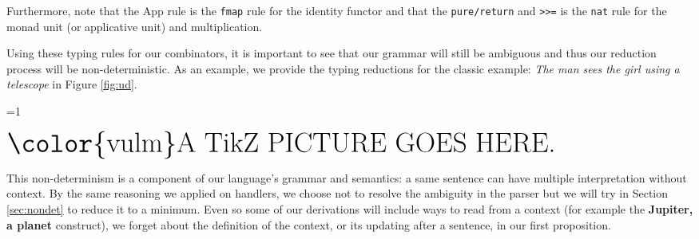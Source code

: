 \documentclass[math, english, info]{cours}
\makeatletter
\def\tikzimp@rt{0}
\def\inputtikz#1{
	\ifnum\tikzimp@rt=1
		
	\else
		\ensuremath{\text{\Huge\color{vulm}A TikZ PICTURE GOES HERE.}}
	\fi
}
\makeatother
\begin{document}
Furthermore, note that the App rule is the \texttt{fmap} rule for the identity functor and that the \texttt{pure/return} and \texttt{>>=} is the \texttt{nat} rule for the monad unit (or applicative unit) and multiplication.

\medskip

Using these typing rules for our combinators, it is important to see that our grammar will still be ambiguous and thus our reduction process will be non-deterministic.
As an example, we provide the typing reductions for the classic example: \textsl{The man sees the girl using a telescope} in Figure \ref{fig:ud}.

\makeatletter
\def\c@lsep{2.3}
\def\r@wsep{.8}


\newcommand{\wnode}[3]{%
	\node (#2) at (#1*\c@lsep, 0) [wordnode] {#2};
	\node[anchor=north] (#2-) at ($(#1*\c@lsep, 0) + (0, -.142)$) [typenode] {\ensuremath{#3}};
}
\newcommand{\utnode}[3]{%
	\path let \p1 = (#2.north), \p2 = (#3.north) in coordinate (Q1) at (\x1, {max(\y1, \y2)});
	\path let \p1 = (#2.north), \p2 = (#3.north) in coordinate (Q2) at (\x2, {max(\y1, \y2)});
	\node (#2#3) at ($($(Q1)!0.5!(Q2)$) + (0, 1)$) [treenode] {\ensuremath{#1}};
	\draw[uptree] ($(#2.north) + (0, .142)$) -- (#2#3.south);
	\draw[uptree] ($(#3.north) + (0, .142)$) -- (#2#3.south);
}
\newcommand{\dtnode}[4][0.5]{%
	\path let \p1 = (#3.south), \p2 = (#4.south) in coordinate (Q1) at (\x1, {min(\y1, \y2)});
	\path let \p1 = (#3.south), \p2 = (#4.south) in coordinate (Q2) at (\x2, {min(\y1, \y2)});
	\node (#3#4) at ($($(Q1)!#1!(Q2)$) + (0, -1)$) [treenode] {\ensuremath{#2}};
	\draw[downtree] ($(#3.south) + (0, -.142)$) -- (#3#4.north);
	\draw[downtree] ($(#4.south) + (0, -.142)$) -- (#3#4.north);
}
\makeatother

\begin{figure*}
	\centering
	\inputtikz{parse-tree-ex}
		\caption{Parsing trees for the typing of \textsl{The man sees the girl using a telescope}.}
	\label{fig:ud}
\end{figure*}

This non-determinism is a component of our language's grammar and semantics: a same sentence can have multiple interpretation without context.
By the same reasoning we applied on handlers, we choose not to resolve the ambiguity in the parser but we will try in Section \ref{sec:nondet} to reduce it to a minimum.
Even so some of our derivations will include ways to read from a context (for example the \textbf{Jupiter, a planet} construct), we forget about the definition of the context, or its updating after a sentence, in our first proposition.
\end{document}
